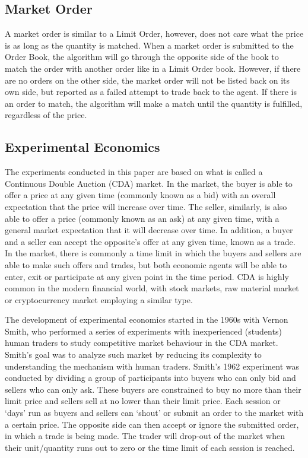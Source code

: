 \subsection{Market Order}
A market order is similar to a Limit Order, however, does not care what the price is as long as the quantity is matched. When a market order is submitted to the Order Book, the algorithm will go through the opposite side of the book to match the order with another order like in a Limit Order book. However, if there are no orders on the other side, the market order will not be listed back on its own side, but reported as a failed attempt to trade back to the agent. If there is an order to match, the algorithm will make a match until the quantity is fulfilled, regardless of the price. 

\subsection{Experimental Economics}
The experiments conducted in this paper are based on what is called a Continuous Double Auction (CDA) market. In the market, the buyer is able to offer a price at any given time (commonly known as a bid) with an overall expectation that the price will increase over time. The seller, similarly, is also able to offer a price (commonly known as an ask)  at any given time, with a general market expectation that it will decrease over time. In addition, a buyer and a seller can accept the opposite’s offer at any given time, known as a trade. In the market, there is commonly a time limit in which the buyers and sellers are able to make such offers and trades, but both economic agents will be able to enter, exit or participate at any given point in the time period. CDA is highly common in the modern financial world, with stock markets, raw material market or cryptocurrency market employing a similar type. 

The development of experimental economics started in the 1960s with Vernon Smith, who performed a series of experiments with inexperienced (students) human traders to study competitive market behaviour in the CDA market. Smith’s goal was to analyze such market by reducing its complexity to understanding the mechanism with human traders. Smith’s 1962 experiment was conducted by dividing a group of participants into buyers who can only bid and sellers who can only ask. These buyers are constrained to buy no more than their limit price and sellers sell at no lower than their limit price. Each session or ‘days’ run as buyers and sellers can ‘shout’ or submit an order to the market with a certain price. The opposite side can then accept or ignore the submitted order, in which a trade is being made. The trader will drop-out of the market when their unit/quantity runs out to zero or the time limit of each session is reached. 

